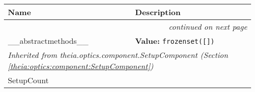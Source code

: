     \vspace{-1cm}
\hspace{\varindent}\begin{longtable}{|p{\varnamewidth}|p{\vardescrwidth}|l}
\cline{1-2}
\cline{1-2} \centering \textbf{Name} & \centering \textbf{Description}& \\
\cline{1-2}
\endhead\cline{1-2}\multicolumn{3}{r}{\small\textit{continued on next page}}\\\endfoot\cline{1-2}
\endlastfoot\raggedright \_\-\_\-a\-b\-s\-t\-r\-a\-c\-t\-m\-e\-t\-h\-o\-d\-s\-\_\-\_\- & \raggedright \textbf{Value:} 
{\tt \texttt{frozenset([}\texttt{])}}&\\
\cline{1-2}
\multicolumn{2}{|l|}{\textit{Inherited from theia.optics.component.SetupComponent \textit{(Section \ref{theia:optics:component:SetupComponent})}}}\\
\multicolumn{2}{|p{\varwidth}|}{\raggedright SetupCount}\\
\cline{1-2}
\end{longtable}

